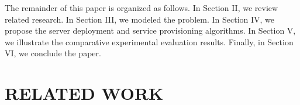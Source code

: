 \documentclass[10pt, conference, letterpaper]{IEEEtran}
\begin{document}
The remainder of this paper is organized as follows. In Section II, we review related research. In Section III, we modeled the problem. In Section IV, we propose the server deployment and service provisioning algorithms. In Section V, we illustrate the comparative experimental evaluation results. Finally, in Section VI, we conclude the paper.

\section{RELATED WORK}
\end{document}
